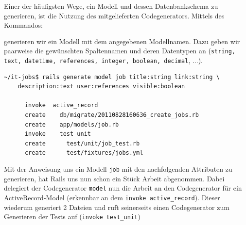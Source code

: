 Einer der häufigsten Wege, ein Modell und dessen Datenbankschema zu generieren, ist die Nutzung des mitgelieferten Codegenerators. Mittels des Kommandos:


generieren wir ein Modell mit dem angegebenen Modellnamen. Dazu geben wir paarweise die gewünschten Spaltennamen und deren Datentypen an (\texttt{string, text, datetime, references, integer, boolean, decimal}, ...).
\begin{lstlisting}
~/it-jobs$ rails generate model job title:string link:string \
    description:text user:references visible:boolean

      invoke  active_record
      create    db/migrate/20110828160636_create_jobs.rb
      create    app/models/job.rb
      invoke    test_unit
      create      test/unit/job_test.rb
      create      test/fixtures/jobs.yml

\end{lstlisting}
Mit der Anweisung uns ein Modell \texttt{job} mit den nachfolgenden Attributen zu generieren, hat Rails uns nun schon ein Stück Arbeit abgenommen. Dabei delegiert der Codegenerator \texttt{model} nun die Arbeit an den Codegenerator für ein ActiveRecord-Model (erkennbar an dem \texttt{invoke active\_record}). Dieser wiederum generiert 2 Dateien und ruft seinerseits einen Codegenerator zum Generieren der Tests auf (\texttt{invoke test\_unit})

